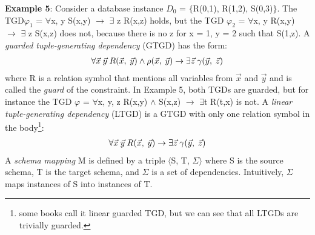\documentclass[11pt, a4paper, dvipsnames]{article}
\begin{document}
\textbf{Example 5}: Consider a database instance $D_{0}$ = $\{$R(0,1), R(1,2), S(0,3)$\}$. The TGD\newline $\varphi_{1}$ = $\forall$x, y S(x,y) $\rightarrow$ $\exists$ z R(x,z) holds, but the TGD $\varphi_{2}$ = $\forall$x, y R(x,y) $\rightarrow$ $\exists$ z S(x,z) does not, because there is no z for x = 1, y = 2 such that S(1,z).\newline
A \textit{guarded tuple-generating dependency} (GTGD) has the form:
\begin{gather*}
\forall \vec{x} \hspace{0.25em}\vec{y} \hspace{0.25em}R(\vec{x}, \hspace{0.25em} \vec{y}) \wedge \rho(\vec{x}, \hspace{0.25em}\vec{y}) \rightarrow \exists \vec{z} \hspace{0.25em}\gamma(\vec{y}, \hspace{0.25em}\vec{z})
\end{gather*}
where R is a relation symbol that mentions all variables from $\vec{x}$ and $\vec{y}$ and is called the \textit{guard} of the constraint. In Example 5, both TGDs are guarded, but for instance the TGD $\varphi$ = $\forall$x, y, z R(x,y) $\wedge$ S(x,z) $\rightarrow$ $\exists$t R(t,x) is not.\newline
A \textit{linear tuple-generating dependency} (LTGD) is a GTGD with only one relation symbol in the body\footnote{some books call it linear guarded TGD, but we can see that all LTGDs are trivially guarded.}:
\begin{gather*}
\forall \vec{x} \hspace{0.25em}\vec{y} \hspace{0.25em}R(\vec{x}, \hspace{0.25em} \vec{y}) \rightarrow \exists \vec{z} \hspace{0.25em}\gamma(\vec{y}, \hspace{0.25em}\vec{z})
\end{gather*}
A \textit{schema mapping} M is defined by a triple $\langle$S, T, $\Sigma\rangle$ where S is the source schema, T is the target schema, and $\Sigma$ is a set of dependencies. Intuitively, $\Sigma$ maps instances of S into instances of T.
\end{document}
